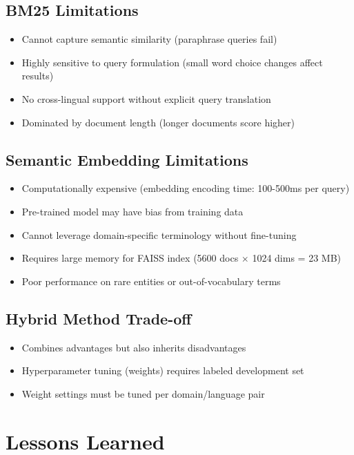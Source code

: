 \documentclass[12pt,a4paper]{report}
\begin{document}
\subsection{BM25 Limitations}
\begin{itemize}
    \item Cannot capture semantic similarity (paraphrase queries fail)
    \item Highly sensitive to query formulation (small word choice changes affect results)
    \item No cross-lingual support without explicit query translation
    \item Dominated by document length (longer documents score higher)
\end{itemize}

\subsection{Semantic Embedding Limitations}
\begin{itemize}
    \item Computationally expensive (embedding encoding time: 100-500ms per query)
    \item Pre-trained model may have bias from training data
    \item Cannot leverage domain-specific terminology without fine-tuning
    \item Requires large memory for FAISS index (5600 docs $\times$ 1024 dims = 23 MB)
    \item Poor performance on rare entities or out-of-vocabulary terms
\end{itemize}

\subsection{Hybrid Method Trade-off}
\begin{itemize}
    \item Combines advantages but also inherits disadvantages
    \item Hyperparameter tuning (weights) requires labeled development set
    \item Weight settings must be tuned per domain/language pair
\end{itemize}

\section{Lessons Learned}
\end{document}

